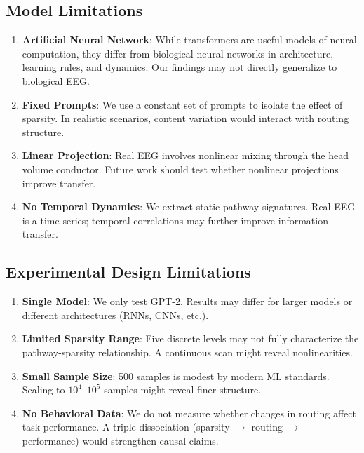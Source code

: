 \label{sec:limitations}

\subsection{Model Limitations}

\begin{enumerate}
    \item \textbf{Artificial Neural Network}: While transformers are useful models of neural computation, they differ from biological neural networks in architecture, learning rules, and dynamics. Our findings may not directly generalize to biological EEG.
    
    \item \textbf{Fixed Prompts}: We use a constant set of prompts to isolate the effect of sparsity. In realistic scenarios, content variation would interact with routing structure.
    
    \item \textbf{Linear Projection}: Real EEG involves nonlinear mixing through the head volume conductor. Future work should test whether nonlinear projections improve transfer.
    
    \item \textbf{No Temporal Dynamics}: We extract static pathway signatures. Real EEG is a time series; temporal correlations may further improve information transfer.
\end{enumerate}

\subsection{Experimental Design Limitations}

\begin{enumerate}
    \item \textbf{Single Model}: We only test GPT-2. Results may differ for larger models or different architectures (RNNs, CNNs, etc.).
    
    \item \textbf{Limited Sparsity Range}: Five discrete levels may not fully characterize the pathway-sparsity relationship. A continuous scan might reveal nonlinearities.
    
    \item \textbf{Small Sample Size}: 500 samples is modest by modern ML standards. Scaling to $10^4$--$10^5$ samples might reveal finer structure.
    
    \item \textbf{No Behavioral Data}: We do not measure whether changes in routing affect task performance. A triple dissociation (sparsity $\rightarrow$ routing $\rightarrow$ performance) would strengthen causal claims.
\end{enumerate}

